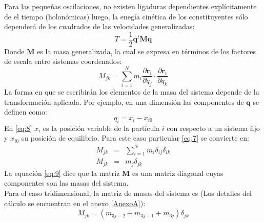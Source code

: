Para las peque\~{n}as oscilaciones, no existen ligaduras dependientes expl\'{i}citamente de el tiempo (holon\'{o}micas) luego, la eneg\'{i}a cin\'{e}tica de los constituyentes s\'{o}lo depender\'{a} de los cuadrados de las velocidades generalizadas:
\begin{equation}\label{eq:6}
T=\frac{1}{2}\mathbf{q}^t\mathbf{M}\mathbf{q}
\end{equation}
Donde $\mathbf{M}$ es la masa generalizada, la cual se expresa en t\'{e}rminos de los factores de escala entre sistemas coordenados:
\begin{equation}\label{eq:7}
M_{jk}=\sum_{i=1}^{N} m_{i}\frac{\partial \mathbf{r_{i}} }{\partial q_j}\cdot\frac{\partial \mathbf{r_{i}} }{\partial q_k}
\end{equation}
La forma en que se escribir\'{a}n los elementos de la masa del sistema depende de la transformaci\'{o}n aplicada. Por ejemplo, en una dimensi\'{o}n las componentes de $\mathbf{q}$ se definen como:
\begin{equation}\label{eq:8}
q_i=x_i-x_{i0}
\end{equation}
En \eqref{eq:8} $x_i$ es la posici\'{o}n variable de la part\'{i}cula $i$ con respecto a un sistema fijo y $x_{i0}$ su posici\'{o}n de equilibrio. Para este caso particular \eqref{eq:7} se convierte en:
\begin{eqnarray}\label{eq:9}
M_{jk}&=&\sum_{i=1}^{N} m_{i} \delta_{ij}\delta_{ik}\nonumber \\
M_{jk}&=&m_{j} \delta_{jk}
\end{eqnarray}
La equaci\'{o}n \eqref{eq:9} dice que la matriz $\mathbf{M}$ es una matriz diagonal cuyas componentes son las masas del sistema.\\

Para el caso tridimensional, la matriz de masas del sistema es (Los detalles del c\'{a}lculo se encuentran en el anexo \ref{AnexoA}):
\begin{equation}
M_{jk}=\left( m_{3j-2}+m_{3j-1}+m_{3j} \right) \delta_{jk}
\end{equation}

